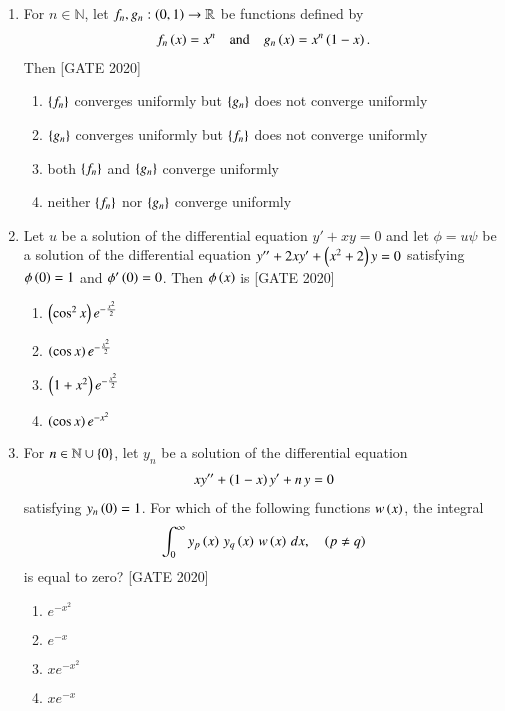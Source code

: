 \documentclass[journal,12pt,onecolumn]{IEEEtran}
\theoremstyle{remark}
\begin{document}
\begin{enumerate}
    \item  For $n \in \mathbb{N}$, let $f_n, g_n : \left(0, 1\right) \to \mathbb{R}$ be functions defined by
    \begin{align*}
    f_n\left(x\right) = x^n \quad \text{and} \quad g_n\left(x\right) = x^n \left(1 - x\right).
    \end{align*}
    Then
    \hfill{[GATE 2020]}\begin{enumerate}
        \item $\left\{f_n\right\}$ converges uniformly but $\left\{g_n\right\}$ does not converge uniformly
        \item $\left\{g_n\right\}$ converges uniformly but $\left\{f_n\right\}$ does not converge uniformly
        \item both $\left\{f_n\right\}$ and $\left\{g_n\right\}$ converge uniformly
        \item neither $\left\{f_n\right\}$ nor $\left\{g_n\right\}$ converge uniformly
    \end{enumerate}

    \item  Let $u$ be a solution of the differential equation $y' + xy = 0$ and let $\phi = u\psi$ be a solution of the differential equation $y'' + 2xy' + \left(x^2 + 2\right)y = 0$ satisfying $\phi\left(0\right) = 1$ and $\phi'\left(0\right) = 0$. Then $\phi\left(x\right)$ is
    \hfill{[GATE 2020]}\begin{multicols}{2}\begin{enumerate}
        \item $\left(\cos^2 x\right)e^{-\frac{x^2}{2}}$
        \item $\left(\cos x\right)e^{-\frac{x^2}{2}}$
        \item $\left(1 + x^2\right)e^{-\frac{x^2}{2}}$
        \item $\left(\cos x\right)e^{-x^2}$
    \end{enumerate}\end{multicols}
     \item For $n \in \mathbb{N} \cup \left\{0\right\}$, let $y_n$ be a solution of the differential equation
    \begin{align*}
    xy'' + \left(1 - x\right)y' + n \, y = 0
    \end{align*}
    satisfying $y_n\left(0\right) = 1$. For which of the following functions $w\left(x\right)$, the integral
    \begin{align*}
    \int_0^{\infty} y_p\left(x\right) \, y_q\left(x\right) \, w\left(x\right) \, dx, \quad \left(p \neq q\right)
    \end{align*}
    is equal to zero?
    \hfill{[GATE 2020]}\begin{multicols}{2}\begin{enumerate}
        \item $e^{-x^2}$
        \item $e^{-x}$
        \item $x e^{-x^2}$
        \item $x e^{-x}$
    \end{enumerate}\end{multicols}


\end{enumerate}
\end{document}
